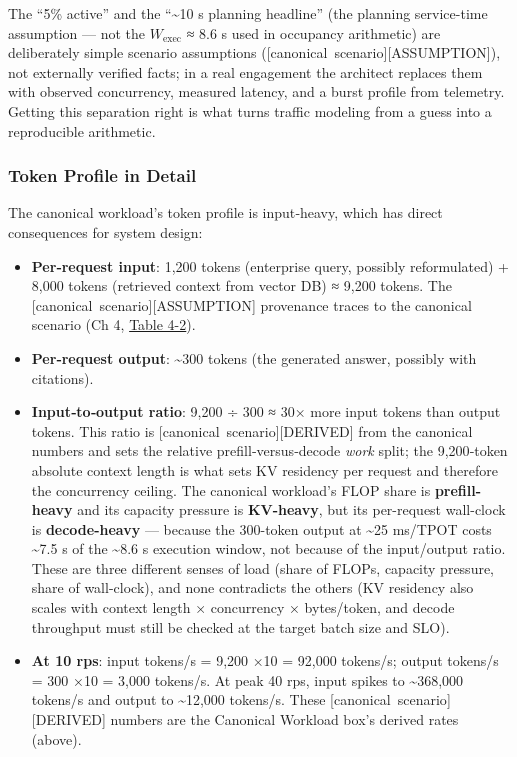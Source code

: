 The ``5\% active'' and the ``\textasciitilde10 s planning headline''
(the planning service-time assumption --- not the \(W_{\mathrm{exec}}\)
≈ 8.6 s used in occupancy arithmetic) are deliberately simple scenario
assumptions (\mbox{{[}canonical scenario{]}}\hspace{0pt}\mbox{{[}ASSUMPTION{]}}), not externally
verified facts; in a real engagement the architect replaces them with
observed concurrency, measured latency, and a burst profile from
telemetry. Getting this separation right is what turns traffic modeling
from a guess into a reproducible arithmetic.

\subsubsection{Token Profile in Detail}\label{token-profile-in-detail}

The canonical workload's token profile is input‑heavy, which has direct
consequences for system design:

\begin{itemize}
\tightlist
\item
  \textbf{Per‑request input}: 1,200 tokens (enterprise query, possibly
  reformulated) + 8,000 tokens (retrieved context from vector DB) ≈
  9,200 tokens. The \mbox{{[}canonical scenario{]}}\hspace{0pt}\mbox{{[}ASSUMPTION{]}} provenance
  traces to the canonical scenario (Ch 4, \hyperref[tab:4.2]{Table 4-2}).
\item
  \textbf{Per‑request output}: \textasciitilde300 tokens (the generated
  answer, possibly with citations).
\item
  \textbf{Input‑to‑output ratio}: 9,200 ÷ 300 ≈ 30× more input tokens
  than output tokens. This ratio is \mbox{{[}canonical
  scenario{]}}\hspace{0pt}\mbox{{[}DERIVED{]}} from the canonical numbers and sets the
  relative prefill‑versus‑decode \emph{work} split; the 9,200‑token
  absolute context length is what sets KV residency per request and
  therefore the concurrency ceiling. The canonical workload's FLOP share
  is \textbf{prefill-heavy} and its capacity pressure is
  \textbf{KV-heavy}, but its per-request wall-clock is
  \textbf{decode-heavy} --- because the 300-token output at
  \textasciitilde25 ms/TPOT costs \textasciitilde7.5 s of the
  \textasciitilde8.6 s execution window, not because of the input/output
  ratio. These are three different senses of load (share of FLOPs,
  capacity pressure, share of wall-clock), and none contradicts the
  others (KV residency also scales with context length × concurrency ×
  bytes/token, and decode throughput must still be checked at the target
  batch size and SLO).
\item
  \textbf{At 10 rps}: input tokens/s = 9,200 ×10 = 92,000 tokens/s;
  output tokens/s = 300 ×10 = 3,000 tokens/s. At peak 40 rps, input
  spikes to \textasciitilde368,000 tokens/s and output to
  \textasciitilde12,000 tokens/s. These \mbox{{[}canonical
  scenario{]}}\hspace{0pt}\mbox{{[}DERIVED{]}} numbers are the Canonical Workload box's
  derived rates (above).
\end{itemize}

